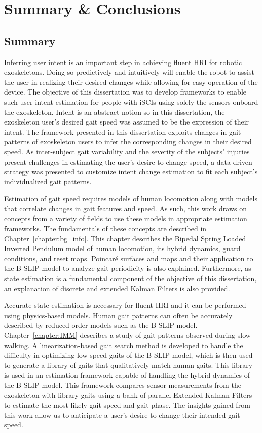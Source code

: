 \chapter{Summary \& Conclusions}\label{chapter:conc}
\section{Summary}
Inferring user intent is an important step in achieving fluent HRI for robotic exoskeletons. Doing so predictively and intuitively will enable the robot to assist the user in realizing their desired changes while allowing for easy operation of the device. The objective of this dissertation was to develop frameworks to enable such user intent estimation for people with iSCIs using solely the sensors onboard the exoskeleton. Intent is an abstract notion so in this dissertation, the exoskeleton user's desired gait speed was assumed to be the expression of their intent. The framework presented in this dissertation exploits changes in gait patterns of exoskeleton users to infer the corresponding changes in their desired speed. As inter-subject gait variability and the severity of the subjects' injuries present challenges in estimating the user's desire to change speed, a data-driven strategy was presented to customize intent change estimation to fit each subject's individualized gait patterns.

Estimation of gait speed requires models of human locomotion along with models that correlate changes in gait features and speed. As such, this work draws on concepts from a variety of fields to use these models in appropriate estimation frameworks. The fundamentals of these concepts are described in Chapter~\ref{chapter:bg_info}. This chapter describes the Bipedal Spring Loaded Inverted Pendulum model of human locomotion, its hybrid dynamics, guard conditions, and reset maps. Poincar\'e surfaces and maps and their application to the B-SLIP model to analyze gait periodicity is also explained. Furthermore, as state estimation is a fundamental component of the objective of this dissertation, an explanation of discrete and extended Kalman Filters is also provided.

Accurate state estimation is necessary for fluent HRI and it can be performed using physics-based models. Human gait patterns can often be accurately described by reduced-order models such as the B-SLIP model. Chapter~\ref{chapter:IMM} describes a study of gait patterns observed during slow walking. A linearization-based gait search method is developed to handle the difficulty in optimizing low-speed gaits of the B-SLIP model, which is then used to generate a library of gaits that qualitatively match human gaits. This library is used in an estimation framework capable of handling the hybrid dynamics of the B-SLIP model. This framework compares sensor measurements from the exoskeleton with library gaits using a bank of parallel Extended Kalman Filters to estimate the most likely gait speed and gait phase. The insights gained from this work allow us to anticipate a user's desire to change their intended gait speed.

